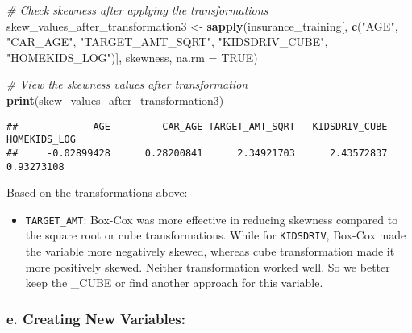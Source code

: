 \documentclass[
]{article}
\newenvironment{Shaded}{\begin{snugshade}}{\end{snugshade}}
\newcommand{\AttributeTok}[1]{\textcolor[rgb]{0.13,0.29,0.53}{#1}}
\newcommand{\CommentTok}[1]{\textcolor[rgb]{0.56,0.35,0.01}{\textit{#1}}}
\newcommand{\ConstantTok}[1]{\textcolor[rgb]{0.56,0.35,0.01}{#1}}
\newcommand{\FunctionTok}[1]{\textcolor[rgb]{0.13,0.29,0.53}{\textbf{#1}}}
\newcommand{\NormalTok}[1]{#1}
\newcommand{\OtherTok}[1]{\textcolor[rgb]{0.56,0.35,0.01}{#1}}
\newcommand{\SpecialCharTok}[1]{\textcolor[rgb]{0.81,0.36,0.00}{\textbf{#1}}}
\newcommand{\StringTok}[1]{\textcolor[rgb]{0.31,0.60,0.02}{#1}}
\providecommand{\tightlist}{%
  \setlength{\itemsep}{0pt}\setlength{\parskip}{0pt}}
\begin{document}
\begin{Shaded}
\end{Shaded}

\begin{Shaded}
\begin{Highlighting}[]
\CommentTok{\# Check skewness after applying the transformations}
\NormalTok{skew\_values\_after\_transformation3 }\OtherTok{\textless{}{-}} \FunctionTok{sapply}\NormalTok{(insurance\_training[, }\FunctionTok{c}\NormalTok{(}\StringTok{"AGE"}\NormalTok{, }\StringTok{"CAR\_AGE"}\NormalTok{, }\StringTok{"TARGET\_AMT\_SQRT"}\NormalTok{, }\StringTok{"KIDSDRIV\_CUBE"}\NormalTok{, }\StringTok{"HOMEKIDS\_LOG"}\NormalTok{)], skewness, }\AttributeTok{na.rm =} \ConstantTok{TRUE}\NormalTok{)}

\CommentTok{\# View the skewness values after transformation}
\FunctionTok{print}\NormalTok{(skew\_values\_after\_transformation3)}
\end{Highlighting}
\end{Shaded}

\begin{verbatim}
##             AGE         CAR_AGE TARGET_AMT_SQRT   KIDSDRIV_CUBE    HOMEKIDS_LOG 
##     -0.02899428      0.28200841      2.34921703      2.43572837      0.93273108
\end{verbatim}

Based on the transformations above:

\begin{itemize}
\tightlist
\item
  \texttt{TARGET\_AMT}: Box-Cox was more effective in reducing skewness
  compared to the square root or cube transformations. While for
  \texttt{KIDSDRIV}, Box-Cox made the variable more negatively skewed,
  whereas cube transformation made it more positively skewed. Neither
  transformation worked well. So we better keep the \_CUBE or find
  another approach for this variable.
\end{itemize}

\subsubsection{e. Creating New
Variables:}\label{e.-creating-new-variables-1}
\end{document}
